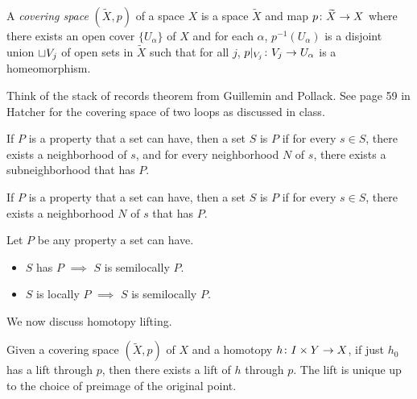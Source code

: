 \documentclass[11pt,leqno,oneside]{amsart}
\numberwithin{thm}{section}
\newcommand{\x}{\times}
\begin{document}
\begin{defn}
  A \emph{covering space} \((\widetilde{X},p)\) of a space \(X\) is a space \(\widetilde{X}\)
  and map \(p \colon \widetilde{X} \to X\) where there exists an open cover
  \(\{U_\alpha\}\) of \(X\) and for each $\alpha$, \(p^{-1}(U_\alpha)\) is a
  disjoint union $\sqcup V_j$ of open sets in \(\widetilde{X}\) such that for all $j$, $p|_{V_j} \colon V_j \to U_\alpha$ is a homeomorphism.
\end{defn}

Think of the stack of records theorem from Guillemin and Pollack. See
page 59 in Hatcher for the covering space of two loops as discussed in
class.

\begin{defn}
  If $P$ is a property that a set can have, then a set $S$ is  $P$ if for every $s \in S$, there exists a neighborhood of $s$, and for every neighborhood $N$ of $s$, there exists a subneighborhood that has $P$.
\end{defn}
\begin{defn}
  If $P$ is a property that a set can have, then a set $S$ is  $P$ if for every $s \in S$, there exists a neighborhood $N$ of $s$ that has $P$.
\end{defn}
\begin{prop}
  Let $P$ be any property a set can have.
  \begin{itemize}
    \item $S$ has $P$ $\implies$ $S$ is semilocally $P$.
    \item $S$ is locally $P$ $\implies$ $S$ is semilocally $P$.
  \end{itemize}
\end{prop}

We now discuss homotopy lifting.

\begin{prop}
  Given a covering space \((\widetilde{X},p)\) of \(X\) and a homotopy
  \(h \from I \x Y \to X\), if just $h_0$ has a lift through $p$, then there exists a lift of \(h\) through $p$.  The lift is unique up to the choice of preimage of the original point.
  \begin{center}
  \end{center}
\end{prop}
\end{document}
